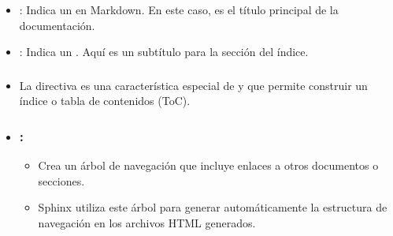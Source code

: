 \documentclass[a4paper,10pt,oneside,spanish,openany]{sphinxmanual}
\begin{document}
\begin{itemize}
\begin{itemize}
\begin{sphinxVerbatim}[commandchars=\\\{\}]

 
 

\end{sphinxVerbatim}

\item {} 
\sphinxAtStartPar
\sphinxcode{\sphinxupquote{\#}}: Indica un  en Markdown. En este caso, es el título principal de la documentación.

\item {} 
\sphinxAtStartPar
\sphinxcode{\sphinxupquote{\#\#}}: Indica un . Aquí es un subtítulo para la sección del índice.

\item {} \subsubsection*{}

\sphinxAtStartPar
La directiva  es una característica especial de  y  que permite construir un índice o tabla de contenidos (ToC).

\item {} \subsubsection*{:}
\begin{itemize}
\item {} 
\sphinxAtStartPar
Crea un árbol de navegación que incluye enlaces a otros documentos o secciones.

\item {} 
\sphinxAtStartPar
Sphinx utiliza este árbol para generar automáticamente la estructura de navegación en los archivos HTML generados.


\end{itemize}
\end{itemize}
\end{itemize}
\end{document}
